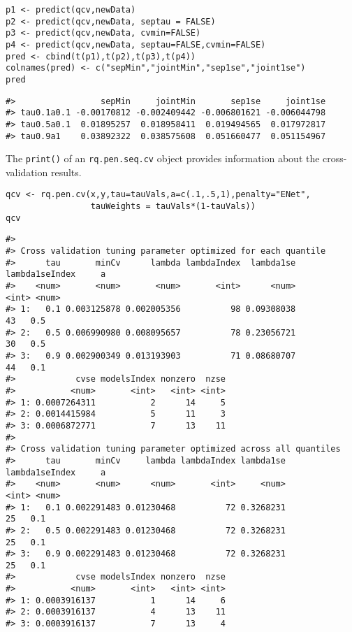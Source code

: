 \begin{verbatim}
p1 <- predict(qcv,newData)
p2 <- predict(qcv,newData, septau = FALSE)
p3 <- predict(qcv,newData, cvmin=FALSE)
p4 <- predict(qcv,newData, septau=FALSE,cvmin=FALSE)
pred <- cbind(t(p1),t(p2),t(p3),t(p4))
colnames(pred) <- c("sepMin","jointMin","sep1se","joint1se")
pred
\end{verbatim}

\begin{verbatim}
#>                 sepMin     jointMin       sep1se     joint1se
#> tau0.1a0.1 -0.00170812 -0.002409442 -0.006801621 -0.006044798
#> tau0.5a0.1  0.01895257  0.018958411  0.019494565  0.017972817
#> tau0.9a1    0.03892322  0.038575608  0.051660477  0.051154967
\end{verbatim}

The \texttt{print()} of an \texttt{rq.pen.seq.cv} object provides information about the cross-validation results.

\begin{verbatim}
qcv <- rq.pen.cv(x,y,tau=tauVals,a=c(.1,.5,1),penalty="ENet",
                 tauWeights = tauVals*(1-tauVals))
qcv
\end{verbatim}

\begin{verbatim}
#> 
#> Cross validation tuning parameter optimized for each quantile
#>      tau       minCv      lambda lambdaIndex  lambda1se lambda1seIndex     a
#>    <num>       <num>       <num>       <int>      <num>          <int> <num>
#> 1:   0.1 0.003125878 0.002005356          98 0.09308038             43   0.5
#> 2:   0.5 0.006990980 0.008095657          78 0.23056721             30   0.5
#> 3:   0.9 0.002900349 0.013193903          71 0.08680707             44   0.1
#>            cvse modelsIndex nonzero  nzse
#>           <num>       <int>   <int> <int>
#> 1: 0.0007264311           2      14     5
#> 2: 0.0014415984           5      11     3
#> 3: 0.0006872771           7      13    11
#> 
#> Cross validation tuning parameter optimized across all quantiles
#>      tau       minCv     lambda lambdaIndex lambda1se lambda1seIndex     a
#>    <num>       <num>      <num>       <int>     <num>          <int> <num>
#> 1:   0.1 0.002291483 0.01230468          72 0.3268231             25   0.1
#> 2:   0.5 0.002291483 0.01230468          72 0.3268231             25   0.1
#> 3:   0.9 0.002291483 0.01230468          72 0.3268231             25   0.1
#>            cvse modelsIndex nonzero  nzse
#>           <num>       <int>   <int> <int>
#> 1: 0.0003916137           1      14     6
#> 2: 0.0003916137           4      13    11
#> 3: 0.0003916137           7      13     4
\end{verbatim}

